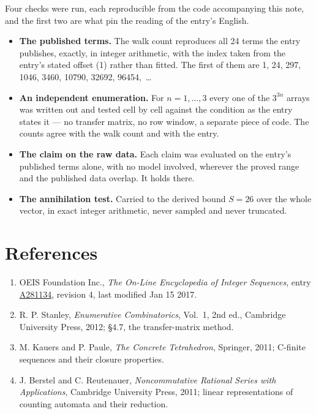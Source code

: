 \documentclass[11pt]{article}
\theoremstyle{definition}
\begin{document}
Four checks were run, each reproducible from the code accompanying this note, and the first two are what pin the reading of the entry's English.

\begin{itemize}

\item {\bfseries The published terms.} The walk count reproduces all 24 terms the entry publishes, exactly, in integer arithmetic, with the index taken from the entry's stated offset (1) rather than fitted. The first of them are 1, 24, 297, 1046, 3460, 10790, 32692, 96454,~\dots

\item {\bfseries An independent enumeration.} For $n = 1,\dots,3$ every one of the $3^{3n}$ arrays was written out and tested cell by cell against the condition as the entry states it --- no transfer matrix, no row window, a separate piece of code. The counts agree with the walk count and with the entry.

\item {\bfseries The claim on the raw data.} Each claim was evaluated on the entry's published terms alone, with no model involved, wherever the proved range and the published data overlap. It holds there.

\item {\bfseries The annihilation test.} Carried to the derived bound $S = 26$ over the whole vector, in exact integer arithmetic, never sampled and never truncated.

\end{itemize}

\section{References}

\begin{enumerate}

\item OEIS Foundation Inc., \emph{The On-Line Encyclopedia of Integer Sequences}, entry \href{https://oeis.org/A281134}{A281134}, revision 4, last modified Jan 15 2017.

\item R. P. Stanley, \emph{Enumerative Combinatorics}, Vol.~1, 2nd ed., Cambridge University Press, 2012; \S4.7, the transfer-matrix method.

\item M. Kauers and P. Paule, \emph{The Concrete Tetrahedron}, Springer, 2011; C-finite sequences and their closure properties.

\item J. Berstel and C. Reutenauer, \emph{Noncommutative Rational Series with Applications}, Cambridge University Press, 2011; linear representations of counting automata and their reduction.

\end{enumerate}
\end{document}
